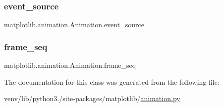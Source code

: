 \subsubsection{\texorpdfstring{event\+\_\+source}{event\_source}}
{\footnotesize\ttfamily matplotlib.\+animation.\+Animation.\+event\+\_\+source}

\mbox{\label{classmatplotlib_1_1animation_1_1Animation_a282fac725479a1151724a18a8fdce81d}} 
\subsubsection{\texorpdfstring{frame\+\_\+seq}{frame\_seq}}
{\footnotesize\ttfamily matplotlib.\+animation.\+Animation.\+frame\+\_\+seq}



The documentation for this class was generated from the following file\+:\begin{DoxyCompactItemize}
\item 
venv/lib/python3./site-\/packages/matplotlib/\hyperlink{animation_8py}{animation.\+py}\end{DoxyCompactItemize}
